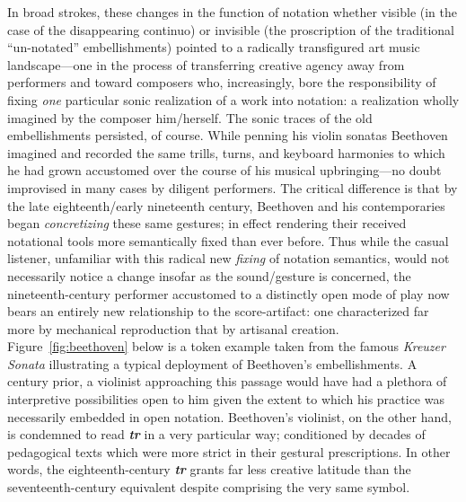     In broad strokes, these changes in the function of notation whether visible (in the case of the disappearing continuo) or invisible (the proscription of the traditional ``un-notated'' embellishments) pointed to a radically transfigured art music landscape---one in the process of transferring creative agency away from performers and toward composers who, increasingly, bore the responsibility of fixing \textit{one} particular sonic realization of a work into notation: a realization wholly imagined by the composer him/herself. The sonic traces of the old embellishments persisted, of course. While penning his violin sonatas Beethoven imagined and recorded the same trills, turns, and keyboard harmonies to which he had grown accustomed over the course of his musical upbringing---no doubt improvised in many cases by diligent performers. The critical difference is that by the late eighteenth/early nineteenth century, Beethoven and his contemporaries began \textit{concretizing} these same gestures; in effect rendering their received notational tools more semantically fixed than ever before. Thus while the casual listener, unfamiliar with this radical new \textit{fixing} of notation semantics, would not necessarily notice a change insofar as the sound/gesture is concerned, the nineteenth-century performer accustomed to a distinctly open mode of play now bears an entirely new relationship to the score-artifact: one characterized far more by mechanical reproduction that by artisanal creation. Figure~\ref{fig:beethoven} below is a token example taken from the famous \textit{Kreuzer Sonata} illustrating a typical deployment of Beethoven's embellishments. A century prior, a violinist approaching this passage would have had a plethora of interpretive possibilities open to him given the extent to which his practice was necessarily embedded in open notation. Beethoven's violinist, on the other hand, is condemned to read \textbf{\textit{tr}} in a very particular way; conditioned by decades of pedagogical texts which were more strict in their gestural prescriptions. In other words, the eighteenth-century \textbf{\textit{tr}} grants far less creative latitude than the seventeenth-century equivalent despite comprising the very same symbol.
    
    
